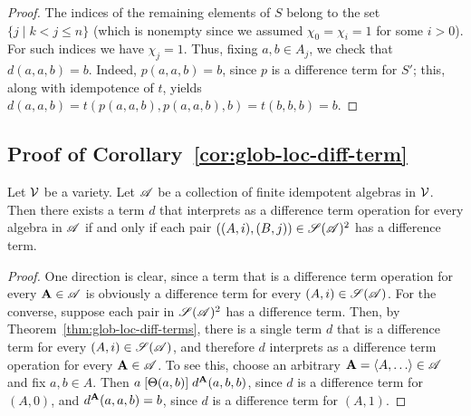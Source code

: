 \begin{proof}
The indices of the remaining elements of $S$
belong to the set $\{j \mid k<j\leq n\}$ (which is nonempty since we
assumed $\chi_0 = \chi_i = 1$ for some $i>0$).
For such indices we have $\chi_j = 1$.
Thus, fixing $a, b \in A_j$, we check that $d(a,a,b) = b$.
Indeed, $p(a,a,b) = b$, since $p$ is a \glocal difference term for $S'$; 
this, along with idempotence of $t$, yields
$d(a,a,b) =t(p(a,a,b), p(a,a,b), b)=t(b, b, b) =b$.
\end{proof}

\subsection{Proof of Corollary~\ref{cor:glob-loc-diff-term}}
\label{sec:proof-cor:glob}
\begin{corollary} %
  Let $\mathcal{V}$ be a variety.  Let $\mathscr{A}$ be a collection of finite idempotent
  algebras in $\mathcal{V}$. %
  Then there exists a term $d$ that interprets as a difference term operation
  for every algebra in $\mathscr{A}$
  if and only if each pair $((A,i), (B,j)) \in \mathscr{S}(\mathscr{A})^2$ has a \glocal
  difference term.
\end{corollary}
\begin{proof}
  One direction is clear, since a term that is a difference term operation for
  every $\mathbf{A} \in \mathscr{A}$ is obviously a \glocal difference term for
  every $(A, i) \in \mathscr{S}(\mathscr{A})$.
  For the converse, suppose
  each pair in $\mathscr{S}(\mathscr{A})^2$ has a \glocal
  difference term. Then, by Theorem~\ref{thm:glob-loc-diff-terms},
  there is a single term $d$ that is a \glocal difference term for every 
  $(A, i) \in \mathscr{S}(\mathscr{A})$, 
  and therefore $d$ interprets as a difference term operation for every $\mathbf{A} \in \mathscr{A}$.
  To see this, choose an arbitrary $\bA = \<A, \dots\> \in \scA$ and fix $a, b \in A$. 
  Then $a \mathrel{[\Theta(a,b)]} d^{\mathbf{A}}(a,b,b)$,
  since $d$ is a \glocal difference term for $(A,0)$,
  and $d^{\mathbf{A}}(a,a,b) = b$, since $d$ is a \glocal
  difference term for $(A,1)$. 
\end{proof}



%
%
%
%






